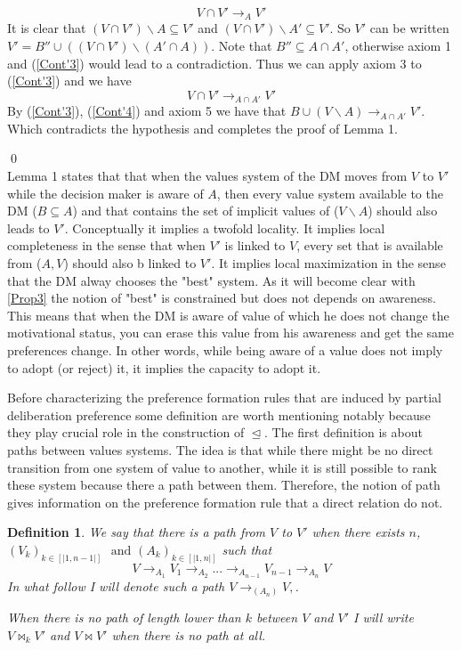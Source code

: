 \documentclass[11pt]{article}
\newtheorem{definition}{Definition}
\begin{document}
\begin{equation} 
V\cap V'\rightarrow_A V'
\label{Cont'3}
\end{equation}
It is clear that $(V\cap V')\backslash A \subseteq V'$ and $(V\cap V')\backslash A' \subseteq V'$. So $V'$ can be written $V'= B''\cup  ((V\cap V')\backslash (A'\cap A))$. Note that $B''\subseteq A\cap A'$, otherwise axiom 1 and (\ref{Cont'3}) would lead to a contradiction. Thus we can apply axiom 3 to (\ref{Cont'3}) and we have 
\begin{equation}
V\cap V'\rightarrow_{A\cap A'} V'
\end{equation}
By (\ref{Cont'3}), (\ref{Cont'4}) and axiom 5 we have that $B\cup (V\backslash A)\rightarrow_{A\cap A'}V'$. Which contradicts the hypothesis and completes the proof of Lemma 1.  

\qed
\\

Lemma 1 states that that when the values system of the DM moves from $V$ to $V'$ while the decision maker is aware of $A$, then every value system available to the DM ($B\subseteq A$) and that contains the set of implicit values of ($V\backslash A$) should also leads to $V'$. Conceptually it implies a twofold locality. It implies local completeness in the sense that when $V'$ is linked to $V$, every set that is available from ($A, V$) should also b linked to $V'$. It implies local maximization in the sense that the DM alway chooses the "best" system. As it will become clear with \ref{Prop3} the notion of "best" is constrained but does not depends on awareness. This means that when the DM is aware of value of which he does not change the motivational status, you can erase this value from his awareness and get the same preferences change. In other words, while being aware of a value does not imply to adopt (or reject) it, it implies the capacity to adopt it.

 Before characterizing the preference formation rules that are induced by partial deliberation preference some definition are worth mentioning notably because they play crucial role in the construction of $\trianglelefteq$.  The first definition is about paths between values systems. The idea is that while there might be no direct transition from one system of value to another, while it is still possible to rank these system because there a path between them. Therefore, the notion of path gives information on the preference formation rule that a direct relation do not.  
\begin{definition} We say that there is a path from $V$ to $V'$ when there exists $n$, $(V_k)_{k\in [|1,n-1|]}$ $\text{ and }(A_k)_{k\in[|1,n|]}$ such that 
\begin{equation}
 V\rightarrow_{A_1} V_1 \rightarrow_{A_2}...\rightarrow_{A_{n-1}} V_{n-1}\rightarrow_{A_n} V
\end{equation}
In what follow I will denote such a path $V\rightarrow_{(A_n)} V,$.


When there is no path of length lower than $k$ between $V$ and $V'$ I will write $V\bowtie_k V'$ and $V\bowtie V'$ when there is no path at all.
\end{definition} 
\end{document}
